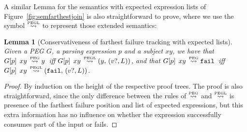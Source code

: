 \documentclass[3p,12pt,singlecolumn]{elsarticle}
\newcommand{\Lp}{\stackrel{\mbox{\tiny{PEG}}}{\leadsto}}
\newcommand{\Lpl}{\stackrel{\mbox{\tiny{PEGL}}}{\leadsto}}
\newcommand{\Tup}[2]{(#1,\,#2)}
\newcommand{\Ex}{v?}
\newcommand{\Fail}{{\tt fail}}
\newtheorem{lemma}[proposition]{Lemma}
\newcommand{\Peg}[2]{#1[#2]}
\newcommand{\Pgg}[1]{\Peg{G}{#1}}
\newcommand{\Mat}[2]{#1\;\,#2\,}
\newcommand{\Matg}[2]{\Mat{\Pgg{#1}}{#2}}
\begin{document}
A similar Lemma for the semantics with expected expression lists
of Figure~\ref{fig:semfarthestjoin} is also straightforward to
prove, where we use the symbol $\Lpl$ to represent those extended
semantics:
\begin{lemma}[Conservativeness of farthest failure tracking with expected lists]
	Given a PEG $G$, a parsing expression $p$ and a subject $xy$, we have that 
	$\Matg{p}{xy} \Lp y$ \,iff\; $\Matg{p}{xy} \Lpl \Tup{y}{(\Ex, L)}$,
	and that 
	$\Matg{p}{xy} \Lp \Fail$ \,iff\; $\Matg{p}{xy} \Lpl \Tup{\Fail}{(\Ex,L)}$.
\end{lemma}
\begin{proof}
By induction on the height of the respective proof trees. 
The proof is also straightforward, since the only difference
between the rules of $\Lp$ and $\Lpl$ is presence of
the farthest failure position and list of expected expressions, 
but this extra information has
no influence on whether the expression successfully
consumes part of the input or fails.
\end{proof}
\clearpage{}	
\end{document}
